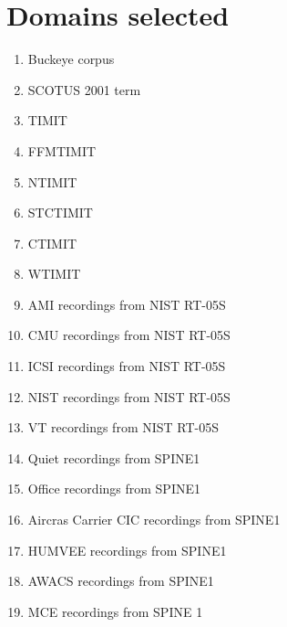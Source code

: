 \documentclass[12pt]{article}
\begin{document}
\section{Domains selected}
\begin{enumerate}
  \item Buckeye corpus
  \item SCOTUS 2001 term
  \item TIMIT
  \item FFMTIMIT
  \item NTIMIT
  \item STCTIMIT
  \item CTIMIT
  \item WTIMIT
  \item AMI recordings from NIST RT-05S
  \item CMU recordings from NIST RT-05S
  \item ICSI recordings from NIST RT-05S
  \item NIST recordings from NIST RT-05S
  \item VT recordings from NIST RT-05S
  \item Quiet recordings from SPINE1
  \item Office recordings from SPINE1
  \item Aircras Carrier CIC recordings from SPINE1
  \item HUMVEE recordings from SPINE1
  \item AWACS recordings from SPINE1
  \item MCE recordings from SPINE 1
\end{enumerate}
\end{document}
